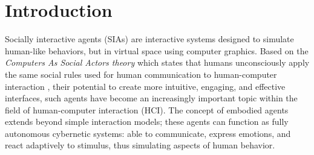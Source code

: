 \documentclass[12pt]{article}
\begin{document}
\newpage

\section{Introduction}

Socially interactive agents (SIAs)\cite{SIAHandbook2021} are interactive systems designed to simulate human-like behaviors, but in virtual space using computer graphics.
Based on the {\em Computers As Social Actors   theory} which states that humans unconsciously apply the same social rules used for human communication to human-computer interaction \cite{reeves1996media}, their potential to create more intuitive, engaging, and effective interfaces, such agents have become an increasingly important topic within the field of human-computer interaction (HCI).  The concept of embodied agents extends beyond simple interaction models; these agents can function as fully autonomous cybernetic systems: able to communicate, express emotions, and react adaptively to stimulus, thus simulating aspects of human behavior.  

\end{document}
